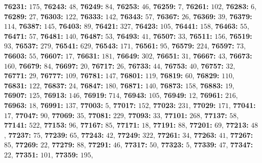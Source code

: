 \textsf{\bfseries 76231:} $175$, \textsf{\bfseries 76243:} $48$, \textsf{\bfseries 76249:} $84$, \textsf{\bfseries 76253:} $46$, \textsf{\bfseries 76259:} $7$, \textsf{\bfseries 76261:} $102$, \textsf{\bfseries 76283:} $6$, \textsf{\bfseries 76289:} $27$, \textsf{\bfseries 76303:} $122$, \textsf{\bfseries 76333:} $142$, \textsf{\bfseries 76343:} $57$, \textsf{\bfseries 76367:} $26$, \textsf{\bfseries 76369:} $39$, \textsf{\bfseries 76379:} $114$, \textsf{\bfseries 76387:} $145$, \textsf{\bfseries 76403:} $89$, \textsf{\bfseries 76421:} $327$, \textsf{\bfseries 76423:} $105$, \textsf{\bfseries 76441:} $158$, \textsf{\bfseries 76463:} $55$, \textsf{\bfseries 76471:} $57$, \textsf{\bfseries 76481:} $140$, \textsf{\bfseries 76487:} $53$, \textsf{\bfseries 76493:} $41$, \textsf{\bfseries 76507:} $33$, \textsf{\bfseries 76511:} $156$, \textsf{\bfseries 76519:} $93$, \textsf{\bfseries 76537:} $279$, \textsf{\bfseries 76541:} $629$, \textsf{\bfseries 76543:} $171$, \textsf{\bfseries 76561:} $95$, \textsf{\bfseries 76579:} $224$, \textsf{\bfseries 76597:} $73$, \textsf{\bfseries 76603:} $55$, \textsf{\bfseries 76607:} $17$, \textsf{\bfseries 76631:} $181$, \textsf{\bfseries 76649:} $302$, \textsf{\bfseries 76651:} $31$, \textsf{\bfseries 76667:} $43$, \textsf{\bfseries 76673:} $160$, \textsf{\bfseries 76679:} $84$, \textsf{\bfseries 76697:} $20$, \textsf{\bfseries 76717:} $26$, \textsf{\bfseries 76733:} $44$, \textsf{\bfseries 76753:} $40$, \textsf{\bfseries 76757:} $32$, \textsf{\bfseries 76771:} $29$, \textsf{\bfseries 76777:} $109$, \textsf{\bfseries 76781:} $147$, \textsf{\bfseries 76801:} $119$, \textsf{\bfseries 76819:} $60$, \textsf{\bfseries 76829:} $110$, \textsf{\bfseries 76831:} $122$, \textsf{\bfseries 76837:} $24$, \textsf{\bfseries 76847:} $180$, \textsf{\bfseries 76871:} $140$, \textsf{\bfseries 76873:} $158$, \textsf{\bfseries 76883:} $19$, \textsf{\bfseries 76907:} $125$, \textsf{\bfseries 76913:} $146$, \textsf{\bfseries 76919:} $714$, \textsf{\bfseries 76943:} $105$, \textsf{\bfseries 76949:} $12$, \textsf{\bfseries 76961:} $216$, \textsf{\bfseries 76963:} $18$, \textsf{\bfseries 76991:} $137$, \textsf{\bfseries 77003:} $5$, \textsf{\bfseries 77017:} $152$, \textsf{\bfseries 77023:} $231$, \textsf{\bfseries 77029:} $171$, \textsf{\bfseries 77041:} $17$, \textsf{\bfseries 77047:} $90$, \textsf{\bfseries 77069:} $35$, \textsf{\bfseries 77081:} $229$, \textsf{\bfseries 77093:} $33$, \textsf{\bfseries 77101:} $268$, \textsf{\bfseries 77137:} $58$, \textsf{\bfseries 77141:} $522$, \textsf{\bfseries 77153:} $96$, \textsf{\bfseries 77167:} $85$, \textsf{\bfseries 77171:} $18$, \textsf{\bfseries 77191:} $88$, \textsf{\bfseries 77201:} $69$, \textsf{\bfseries 77213:} $48$, \textsf{\bfseries 77237:} $75$, \textsf{\bfseries 77239:} $65$, \textsf{\bfseries 77243:} $42$, \textsf{\bfseries 77249:} $322$, \textsf{\bfseries 77261:} $34$, \textsf{\bfseries 77263:} $41$, \textsf{\bfseries 77267:} $85$, \textsf{\bfseries 77269:} $22$, \textsf{\bfseries 77279:} $88$, \textsf{\bfseries 77291:} $46$, \textsf{\bfseries 77317:} $50$, \textsf{\bfseries 77323:} $5$, \textsf{\bfseries 77339:} $47$, \textsf{\bfseries 77347:} $22$, \textsf{\bfseries 77351:} $101$, \textsf{\bfseries 77359:} $195$, 
